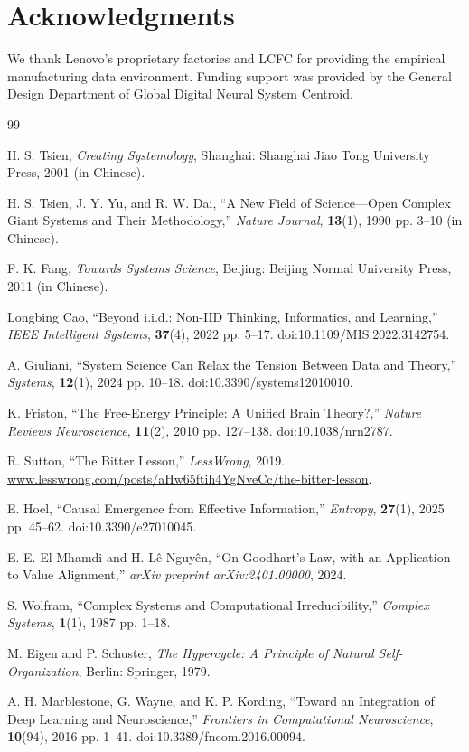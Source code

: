 \documentclass{article}
\begin{document}
\section*{Acknowledgments}
We thank Lenovo's proprietary factories and LCFC for providing the empirical manufacturing data environment. Funding support was provided by the General Design Department of Global Digital Neural System Centroid.

\begin{thebibliography}{99}

H. S. Tsien, \textit{Creating Systemology}, Shanghai: Shanghai Jiao Tong University Press, 2001 (in Chinese).

H. S. Tsien, J. Y. Yu, and R. W. Dai, ``A New Field of Science---Open Complex Giant Systems and Their Methodology,'' \textit{Nature Journal}, \textbf{13}(1), 1990 pp. 3--10 (in Chinese).

F. K. Fang, \textit{Towards Systems Science}, Beijing: Beijing Normal University Press, 2011 (in Chinese).

Longbing Cao, ``Beyond i.i.d.: Non-IID Thinking, Informatics, and Learning,'' \textit{IEEE Intelligent Systems}, \textbf{37}(4), 2022 pp. 5--17. doi:10.1109/MIS.2022.3142754.

A. Giuliani, ``System Science Can Relax the Tension Between Data and Theory,'' \textit{Systems}, \textbf{12}(1), 2024 pp. 10--18. doi:10.3390/systems12010010.

K. Friston, ``The Free-Energy Principle: A Unified Brain Theory?,'' \textit{Nature Reviews Neuroscience}, \textbf{11}(2), 2010 pp. 127--138. doi:10.1038/nrn2787.

R. Sutton, ``The Bitter Lesson,'' \textit{LessWrong}, 2019. \url{www.lesswrong.com/posts/aHw65ftih4YgNveCc/the-bitter-lesson}.

E. Hoel, ``Causal Emergence from Effective Information,'' \textit{Entropy}, \textbf{27}(1), 2025 pp. 45--62. doi:10.3390/e27010045.

E. E. El-Mhamdi and H. L\^e-Nguy\^en, ``On Goodhart's Law, with an Application to Value Alignment,'' \textit{arXiv preprint arXiv:2401.00000}, 2024.

S. Wolfram, ``Complex Systems and Computational Irreducibility,'' \textit{Complex Systems}, \textbf{1}(1), 1987 pp. 1--18.

M. Eigen and P. Schuster, \textit{The Hypercycle: A Principle of Natural Self-Organization}, Berlin: Springer, 1979.

A. H. Marblestone, G. Wayne, and K. P. Kording, ``Toward an Integration of Deep Learning and Neuroscience,'' \textit{Frontiers in Computational Neuroscience}, \textbf{10}(94), 2016 pp. 1--41. doi:10.3389/fncom.2016.00094.

\end{thebibliography}
\end{document}
